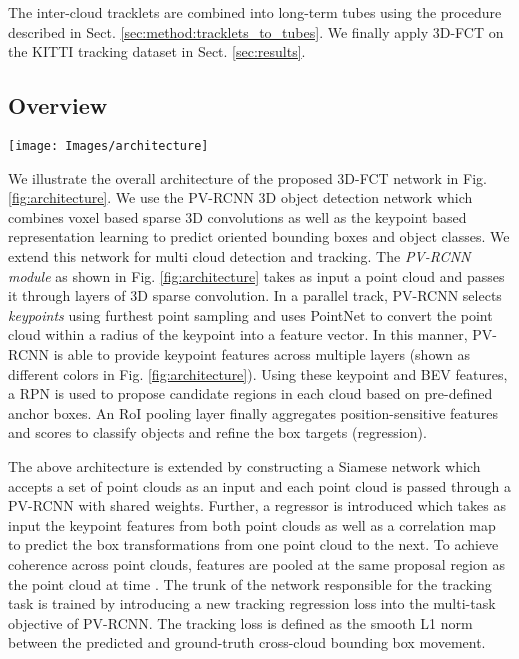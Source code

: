 \documentclass[10pt,twocolumn,letterpaper]{article}
\begin{document}
The inter-cloud tracklets are combined into long-term tubes using the procedure described in Sect. \ref{sec:method:tracklets_to_tubes}. We finally apply 3D-FCT on the KITTI tracking dataset \cite{Geiger2013IJRR} in Sect. \ref{sec:results}.

\subsection{Overview}\label{sec:method:overview}
\begin{figure*}
   \begin{center}
   \texttt{[image: Images/architecture]}
\end{center}
      \caption{Overview of the 3D-FCT temporal detection architecture. A pair of point clouds are processed by a Siamese PV-RCNN network to provide keypoint features. These keypoint features are compared using a correlation operation before being used to regress cross-cloud bounding box targets.}
   \label{fig:architecture}
\end{figure*}

We illustrate the overall architecture of the proposed 3D-FCT network in Fig. \ref{fig:architecture}. We use the PV-RCNN \cite{Shi_2020_CVPR} 3D object detection network which combines voxel based sparse 3D convolutions as well as the keypoint based representation learning to predict oriented bounding boxes and object classes. We extend this network for multi cloud detection and tracking. The {\em PV-RCNN module} as shown in Fig. \ref{fig:architecture} takes as input a point cloud and passes it through layers of 3D sparse convolution. In a parallel track, PV-RCNN selects {\em keypoints} using furthest point sampling and uses PointNet \cite{Qi2017} to convert the point cloud within a radius of the keypoint into a feature vector. In this manner, PV-RCNN is able to provide keypoint features across multiple layers (shown as different colors in Fig. \ref{fig:architecture}). Using these keypoint and BEV features, a RPN is used to propose candidate regions in each cloud based on pre-defined anchor boxes. An RoI pooling layer finally aggregates position-sensitive features and scores to classify objects and refine the box targets (regression).

The above architecture is extended by constructing a Siamese network \cite{Bromley1994} which accepts a set of point clouds as an input and each point cloud is passed through a PV-RCNN with shared weights. Further, a regressor is introduced which takes as input the keypoint features from both point clouds as well as a correlation map to predict the box transformations from one point cloud to the next. To achieve coherence across point clouds, features are pooled at the same proposal region as the point cloud at time . The trunk of the network responsible for the tracking task is trained by introducing a new tracking regression loss into the multi-task objective of PV-RCNN. The tracking loss is defined as the smooth L1 norm between the predicted and ground-truth cross-cloud bounding box movement.
\end{document}
